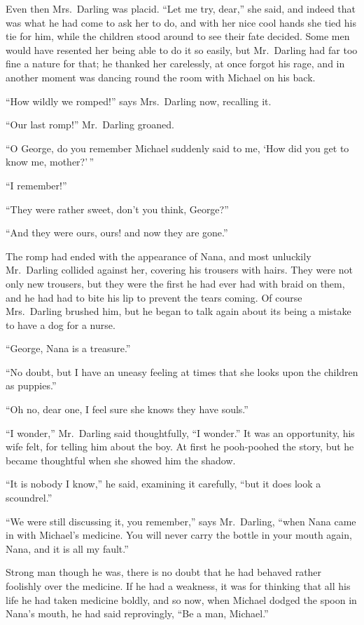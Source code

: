 Even then Mrs.\ Darling was placid. ``Let me try, dear,'' she said, and indeed
that was what he had come to ask her to do, and with her nice cool hands she
tied his tie for him, while the children stood around to see their fate decided.
Some men would have resented her being able to do it so easily, but Mr.\ Darling
had far too fine a nature for that; he thanked her carelessly, at once forgot
his rage, and in another moment was dancing round the room with Michael on his
back.

``How wildly we romped!'' says Mrs.\ Darling now, recalling it.

``Our last romp!'' Mr.\ Darling groaned.

``O George, do you remember Michael suddenly said to me, `How did you get to
know me, mother?'\,''

``I remember!''

``They were rather sweet, don't you think, George?''

``And they were ours, ours! and now they are gone.''

The romp had ended with the appearance of Nana, and most unluckily Mr.\ Darling
collided against her, covering his trousers with hairs. They were not only new
trousers, but they were the first he had ever had with braid on them, and he had
had to bite his lip to prevent the tears coming. Of course Mrs.\ Darling brushed
him, but he began to talk again about its being a mistake to have a dog for a
nurse.

``George, Nana is a treasure.''

``No doubt, but I have an uneasy feeling at times that she looks upon the
children as puppies.''

``Oh no, dear one, I feel sure she knows they have souls.''

``I wonder,'' Mr.\ Darling said thoughtfully, ``I wonder.'' It was an
opportunity, his wife felt, for telling him about the boy. At first he
pooh-poohed the story, but he became thoughtful when she showed him the shadow.

``It is nobody I know,'' he said, examining it carefully, ``but it does look a
scoundrel.''

``We were still discussing it, you remember,'' says Mr.\ Darling, ``when Nana
came in with Michael's medicine. You will never carry the bottle in your mouth
again, Nana, and it is all my fault.''

Strong man though he was, there is no doubt that he had behaved rather foolishly
over the medicine. If he had a weakness, it was for thinking that all his life
he had taken medicine boldly, and so now, when Michael dodged the spoon in
Nana's mouth, he had said reprovingly, ``Be a man, Michael.''

